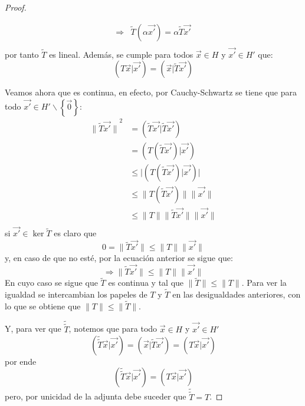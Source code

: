 \documentclass[12pt]{report}
\newcounter{it}
\theoremstyle{largebreak}
\newcommand\abs[1]{\ensuremath{\big|#1\big|}}
\newcommand\adj[1]{\ensuremath{\widetilde{#1}}}
\newcommand\pint[2]{\ensuremath{\left(#1\big|#2\right)}}
\newcommand\norm[1]{\ensuremath{\|#1\|}}
\begin{document}
\begin{proof}
\begin{itemize}
\begin{equation*}
\begin{split}
                    \Rightarrow&\adj{T}(\alpha\vec{x'})=\alpha\adj{T}\vec{x'}\\
                \end{split}
            \end{equation*}
            por tanto $\adj{T}$ es lineal. Además, se cumple para todos $\vec{x}\in H$ y $\vec{x'}\in H'$ que:
            \begin{equation*}
                \pint{T\vec{x}}{\vec{x'}}=\pint{\vec{x}}{\adj{T} \vec{x'}}
            \end{equation*}
        \end{itemize}

        Veamos ahora que es continua, en efecto, por Cauchy-Schwartz se tiene que para todo $\vec{x'}\in H'\backslash\left\{\vec{0} \right\}$:
        \begin{equation*}
            \begin{split}
                \norm{\adj{T}\vec{x'}}^2&=\pint{\adj{T}\vec{x'}}{\adj{T}\vec{x'}}\\
                &=\pint{T(\adj{T}\vec{x'})}{\vec{x'}}\\
                &\leq\abs{\pint{T(\adj{T}\vec{x'})}{\vec{x'}}}\\
                &\leq\norm{T(\adj{T}\vec{x'})}\norm{\vec{x'}} \\
                &\leq\norm{T}\norm{\adj{T}\vec{x'}}\norm{\vec{x'}} \\
            \end{split}
        \end{equation*}
        si $\vec{x'}\in\ker \adj{T}$ es claro que
        \begin{equation*}
            0=\norm{\adj{T}\vec{x'}}\leq\norm{T}\norm{\vec{x'}}
        \end{equation*}
        y, en caso de que no esté, por la ecuación anterior se sigue que:
        \begin{equation*}
            \Rightarrow \norm{\adj{T} \vec{x'}}\leq\norm{T}\norm{\vec{x'}}
        \end{equation*}
        En cuyo caso se sigue que $\adj{T}$ es continua y tal que $\norm{\adj{T}}\leq\norm{T}$. Para ver la igualdad se intercambian los papeles de $T$ y $\adj{T}$ en las desigualdades anteriores, con lo que se obtiene que $\norm{T}\leq\norm{\adj{T}}$.

        Y, para ver que $\adj{\adj{T}}$, notemos que para todo $\vec{x}\in H$ y $\vec{x'}\in H'$
        \begin{equation*}
            \pint{\adj{\adj{T}}\vec{x}}{\vec{x'}}=\pint{\vec{x}}{\adj{T}\vec{x'}}=\pint{T\vec{x}}{\vec{x'}}
        \end{equation*}
        por ende
        \begin{equation*}
            \pint{\adj{\adj{T}}\vec{x}}{\vec{x'}}=\pint{T\vec{x}}{\vec{x'}}
        \end{equation*}
        pero, por unicidad de la adjunta debe suceder que $\adj{\adj{T}}=T$.


\end{proof}
\end{document}
